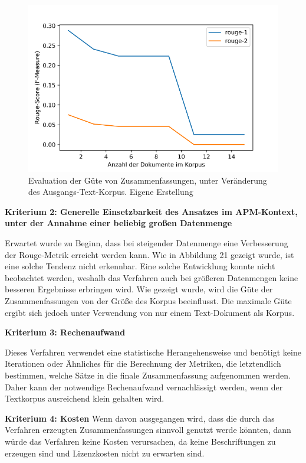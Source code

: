 \begin{figure}[h]
\centering
\includegraphics[scale=0.95]{content/pics/Picture_21.png}
\caption{Evaluation der Güte von Zusammenfassungen, unter Veränderung des Ausgangs-Text-Korpus. Eigene Erstellung}
\label{Abbildung:rouge-metrics}
\end{figure}

{\bf Kriterium 2: Generelle Einsetzbarkeit des Ansatzes im APM-Kontext, unter der Annahme einer beliebig großen Datenmenge}

Erwartet wurde zu Beginn, dass bei steigender Datenmenge eine Verbesserung der Rouge-Metrik erreicht werden kann. Wie in Abbildung 21 gezeigt wurde, ist eine solche Tendenz nicht erkennbar.
Eine solche Entwicklung konnte nicht beobachtet werden, weshalb das Verfahren auch bei größeren Datenmengen keine besseren Ergebnisse erbringen wird. 
Wie gezeigt wurde, wird die Güte der Zusammenfassungen von der Größe des Korpus beeinflusst. Die maximale Güte ergibt sich jedoch unter Verwendung von nur einem Text-Dokument als Korpus.

{\bf Kriterium 3: Rechenaufwand}

Dieses Verfahren verwendet eine statistische Herangehensweise und benötigt keine Iterationen oder Ähnliches für die Berechnung der Metriken, die letztendlich bestimmen, welche Sätze in die finale Zusammenfassung aufgenommen werden. Daher kann der notwendige Rechenaufwand vernachlässigt werden, wenn der Textkorpus ausreichend klein gehalten wird.

{\bf Kriterium 4: Kosten}
Wenn davon ausgegangen wird, dass die durch das Verfahren erzeugten Zusammenfassungen sinnvoll genutzt werde könnten, dann würde das Verfahren keine Kosten verursachen, da keine Beschriftungen zu erzeugen sind und Lizenzkosten nicht zu erwarten sind.

